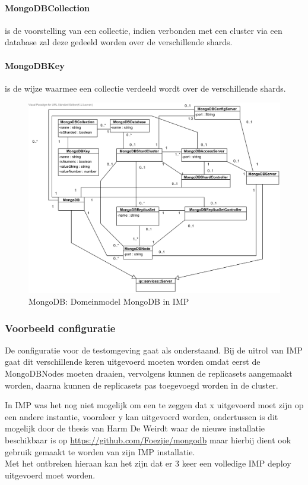 	\paragraph{MongoDBCollection} is de voorstelling van een collectie, indien verbonden met een cluster via een database zal deze gedeeld worden over de verschillende shards. 
	\paragraph{MongoDBKey} is de wijze waarmee een collectie verdeeld wordt over de verschillende shards. 

\begin{figure}[ht!]
\centering
\includegraphics[width=\linewidth]{img/MongoDB-Domeinmodel.png}
\caption{MongoDB: Domeinmodel MongoDB in IMP}
\label{fig:imp-mongodb-domeinmodel}
\end{figure}

\subsubsection{Voorbeeld configuratie}
De configuratie voor de testomgeving gaat als onderstaand. Bij de uitrol van IMP gaat dit verschillende keren uitgevoerd moeten worden omdat eerst de MongoDBNodes moeten draaien, vervolgens kunnen de replicasets aangemaakt worden, daarna kunnen de replicasets pas toegevoegd worden in de cluster. 

In IMP was het nog niet mogelijk om een te zeggen dat x uitgevoerd moet zijn op een andere instantie, vooraleer y kan uitgevoerd worden, ondertussen is dit mogelijk door de thesis van Harm De Weirdt\cite{thesisHarm} waar de nieuwe installatie beschikbaar is op \url{https://github.com/Foezjie/mongodb} maar hierbij dient ook gebruik gemaakt te worden van zijn IMP installatie.  \\
Met het ontbreken hieraan kan het zijn dat er 3 keer een volledige IMP deploy uitgevoerd moet worden. 

